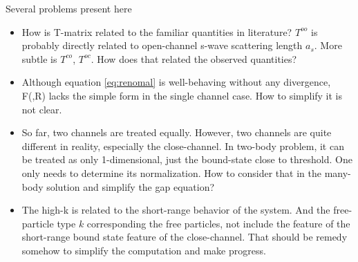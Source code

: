 
Several problems present here 
\begin{itemize}
	\item How is T-matrix related to the familiar quantities in literature?  $T^{oo}$ is probably directly related to open-channel s-wave scattering length $a_s$.  More subtle is $T^{co}$, $T^{oc}$.  How does that related the observed quantities?
	
	\item Although equation \eqref{eq:renomal} is well-behaving without any divergence, F(,R) lacks the simple form in the single channel case.  How to simplify it is not clear.  
	\item So far, two channels are treated equally.  However, two channels are quite different in reality, especially the close-channel.  In two-body problem, it can be treated as only 1-dimensional, just the bound-state close to threshold. One only needs to determine its normalization.  How to consider that in the many-body solution and simplify the gap equation? 
	\item The high-k is related to the short-range behavior of the system.  And the free-particle type $k$ corresponding the free particles, not include the feature of the short-range bound state feature of the close-channel.  That should be remedy somehow to simplify the computation and make progress. 
\end{itemize}
